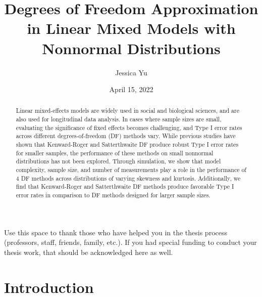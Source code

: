 \documentclass[12pt, twoside]{amherstthesis}
\title{Degrees of Freedom Approximation in Linear Mixed Models with Nonnormal Distributions}
\author{Jessica Yu}
\date{April 15, 2022}
\begin{document}
\doublespace
  \maketitle

\frontmatter %
\pagestyle{fancyplain}

  \begin{abstract}
    Linear mixed-effects models are widely used in social and biological sciences, and are also used for longitudinal data analysis. In cases where sample sizes are small, evaluating the significance of fixed effects becomes challenging, and Type I error rates across different degrees-of-freedom (DF) methods vary. While previous studies have shown that Kenward-Roger and Satterthwaite DF produce robust Type I error rates for smaller samples, the performance of these methods on small nonnormal distributions has not been explored. Through simulation, we show that model complexity, sample size, and number of measurements play a role in the performance of 4 DF methods across distributions of varying skewness and kurtosis. Additionally, we find that Kenward-Roger and Satterthwaite DF methods produce favorable Type I error rates in comparison to DF methods designed for larger sample sizes.
  \end{abstract}
  \begin{acknowledgments}
    Use this space to thank those who have helped you in the thesis process (professors, staff, friends, family, etc.). If you had special funding to conduct your thesis work, that should be acknowledged here as well.
  \end{acknowledgments}

  \hypersetup{linkcolor=black}
  \setcounter{tocdepth}{2}
  \tableofcontents

  \listoftables

  \listoffigures


\mainmatter %
\pagestyle{fancyplain} %

\hypertarget{intro}{%
\chapter{Introduction}\label{intro}}
\end{document}
